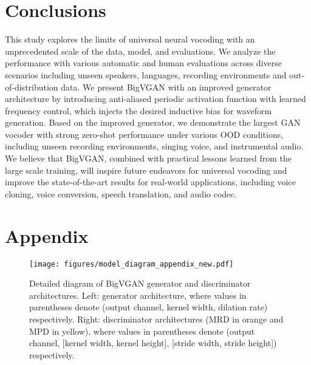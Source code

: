\documentclass{article} \usepackage{iclr2023_conference,times}
\theoremstyle{plain}
\theoremstyle{definition}
\theoremstyle{remark}
\begin{document}
\vspace{-.2cm}
\section{Conclusions}
\label{sec:conclusion}
\vspace{-.1cm}
This study explores the limits of universal neural vocoding with an unprecedented scale of the data, model, and evaluations. We analyze the performance with various automatic and human evaluations across diverse scenarios including unseen speakers, languages, recording environments and out-of-distribution data. We present BigVGAN with an improved generator architecture by introducing anti-aliased periodic activation function with learned frequency control, which injects the desired inductive bias for waveform generation. Based on the improved generator, we demonstrate the largest GAN vocoder with strong zero-shot performance under various OOD conditions, including unseen recording environments, singing voice, and instrumental audio. We believe that BigVGAN, combined with practical lessons learned from the large scale training, will inspire future endeavors for universal vocoding and improve the state-of-the-art results for real-world applications, including voice cloning, voice conversion, speech translation, and audio codec. 















\newpage
\appendix
\section*{\LARGE{Appendix}}

\begin{figure}[h]
\vspace{.3cm}
\centering
\texttt{[image: figures/model\_diagram\_appendix\_new.pdf]}
\vspace{-.3cm}
\caption{\footnotesize
Detailed diagram of BigVGAN generator and discriminator architectures. Left: generator architecture, where values in parentheses denote (output channel, kernel width, dilation rate) respectively. Right: discriminator architectures (MRD in orange and MPD in yellow), where values in parentheses denote (output channel, [kernel width, kernel height], [stride width, stride height]) respectively.}
\vspace{-.5cm}
\label{fig_model_diagram_appendix}
\end{figure}
\end{document}
